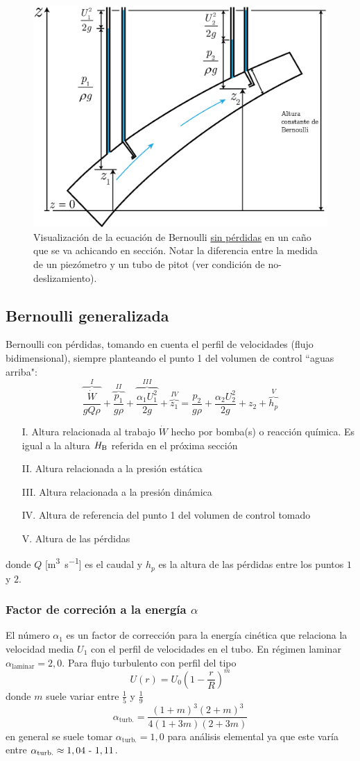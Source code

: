 \begin{figure}
    \centering
    \includegraphics[width=.5\textwidth]{fig/bernoullidiag.eps}
    \caption{Visualización de la ecuación de Bernoulli \underline{sin pérdidas} en un caño que se va achicando en sección. Notar la diferencia entre la medida de un piezómetro y un tubo de pitot (ver condición de no-deslizamiento).}
    \label{fig:diagramaBernoulli}
\end{figure}
\subsection{Bernoulli generalizada}
Bernoulli con pérdidas, tomando en cuenta el perfil de velocidades (flujo bidimensional), siempre planteando el punto 1 del volumen de control ``aguas arriba":
\begin{equation}\label{eq:bernoulliPerdidas}
    \overbrace{\frac{\dot{W}}{gQ\rho}}^{I}+\overbrace{\frac{p_1}{g\rho}}^{II}+\overbrace{\frac{\alpha_1 U_1^2}{2g}}^{III}+\overbrace{z_1}^{IV}=\frac{p_2}{g\rho}+\frac{\alpha_2 U_2^2}{2g}+z_2+\overbrace{h_p}^{V}
\end{equation}
\begin{itemize}
    \item[I.] Altura relacionada al trabajo $\dot{W}$ hecho por bomba(s) o reacción química. Es igual a la altura $H_{\RM{B}}$ referida en el próxima sección
    \item[II.] Altura relacionada a la presión estática
    \item[III.] Altura relacionada a la presión dinámica
    \item[IV.] Altura de referencia del punto 1 del volumen de control tomado
    \item[V.] Altura de las pérdidas
\end{itemize}
donde $Q$ [\si{\meter \cubed \per \second}] es el caudal y $h_p$ es la altura de las pérdidas entre los puntos $1$ y $2$. 
\subsubsection*{Factor de correción a la energía $\alpha$}
El número $\alpha_1$ es un factor de corrección para la energía cinética que relaciona la velocidad media $U_1$ con el perfil de velocidades en el tubo. En régimen laminar $\alpha_{\textrm{laminar}}=2,0$. Para flujo turbulento con perfil del tipo
\[
U(r)=U_0 \left(1-\frac{r}{R}\right)^{m}
\]
donde $m$ suele variar entre $\frac{1}{5}$ y $\frac{1}{9}$
\[
\alpha_{\textrm{turb.}}=\frac{(1+m)^3(2+m)^3}{4(1+3m)(2+3m)}
\]
en general se suele tomar $\alpha_{\textrm{turb.}}=1,0$ para análisis elemental ya que este varía entre $\alpha_{\textrm{turb.}}\approx 1,04\mbox{ - }1,11$.

